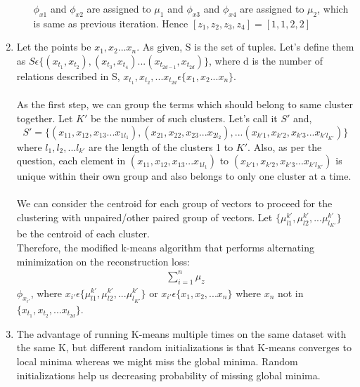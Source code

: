 \documentclass[12pt]{article}
\begin{document}
\begin{enumerate}[label=(\alph*)]
\begin{enumerate}[label=(\arabic*)]
	$\phi_{x1}$ and $\phi_{x2}$ are assigned to $\mu_1$ and $\phi_{x3}$ and $\phi_{x4}$ are assigned to $\mu_2$, which is same as previous iteration. Hence $[z_1, z_2, z_3, z_4] = [1,1,2,2] $\\
	\end{enumerate}
	\item Let the points be $x_1, x_2 ... x_n$. As given, S is the set of tuples. Let's define them as $S \epsilon \{(x_{t_1}, x_{t_2}), (x_{t_3}, x_{t_4})...(x_{t_{2d-1}}, x_{t_{2d}})\}$, where d is the number of relations described in S, $x_{t_1}, x_{t_2}, ... x_{t_{2d}} \epsilon \{x_1, x_2 ... x_n\}$. \\ \\
	As the first step, we can group the terms which should belong to same cluster together. Let $K'$ be the number of such clusters. Let's call it $S'$ and, $$S' = \{(x_{11}, x_{12}, x_{13} ... x_{1l_1}), (x_{21}, x_{22}, x_{23} ... x_{2l_2}), ... (x_{k'1}, x_{k'2}, x_{k'3} ... x_{k'l_{K'}})\}$$
	where $l_1, l_2, ... l_{k'}$ are the length of the clusters 1 to $K'$. Also, as per the question, each element in $(x_{11}, x_{12}, x_{13} ... x_{1l_1})$ to $(x_{k'1}, x_{k'2}, x_{k'3} ... x_{k'l_{K'}})$ is unique within their own group and also belongs to only one cluster at a time. \\ \\
	We can consider the centroid for each group of vectors to proceed for the clustering with unpaired/other paired group of vectors. Let $\{ \mu_{l1}^{k'}, \mu_{l2}^{k'}, ... \mu_{l_{K'}}^{k'} \}$ be the centroid of each cluster. \\
	Therefore, the modified k-means algorithm that performs alternating minimization on the reconstruction loss:
	\begin{align*}
	\sum_{i=1}^n \mu_z
	\end{align*}
	 $\phi_{x_{i'}}$, where $x_{i'} \epsilon \{\mu_{l1}^{k'}, \mu_{l2}^{k'}, ... \mu_{l_{K'}}^{k'}\}$ or $x_{i'} \epsilon \{x_1, x_2, ... x_n\}$ where $x_n$ not in $\{x_{t_1}, x_{t_2}, ... x_{t_{2d}}\}$.
	 
	 \item The advantage of running K-means multiple times on the same dataset with the same K, but different random initializations is that K-means converges to local minima whereas we might miss the global minima. Random initializations help us decreasing probability of missing global minima.
	 

\end{enumerate}
\end{document}
